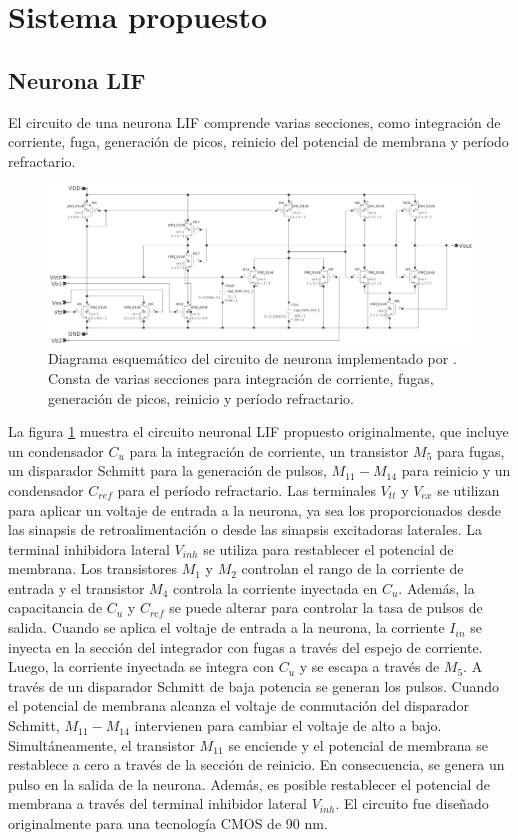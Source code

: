 \documentclass[conference]{IEEEtran}
\begin{document}
\section{Sistema propuesto}

\subsection{Neurona LIF}
El circuito de una neurona LIF comprende varias secciones, como integración de corriente, fuga, generación de picos, reinicio del potencial de membrana y período refractario.

\begin{figure}[ht]
	\centering
	\includegraphics[scale=0.14]{img/cto_neurona_LIF.png}
	\caption{Diagrama esquemático del circuito de neurona implementado por \cite{Shamsi_2018}. Consta de varias secciones para integración de corriente, fugas, generación de picos, reinicio y período refractario.
	\label{fig:cto_neurona_LIF}}
\end{figure}

La figura \ref{fig:cto_neurona_LIF} muestra el circuito neuronal LIF propuesto originalmente, que incluye un condensador $C_{u}$ para la integración de corriente, un transistor $M_5$ para fugas, un disparador Schmitt para la generación de pulsos, $M_{11}-M_{14}$ para reinicio y un condensador $C_{ref}$ para el período refractario. Las terminales $V_{tt}$ y $V_{ex}$ se utilizan para aplicar un voltaje de entrada a la neurona, ya sea los proporcionados desde las sinapsis de retroalimentación o desde las sinapsis excitadoras laterales. La terminal inhibidora lateral $V_{inh}$ se utiliza para restablecer el potencial de membrana. Los transistores $M_{1}$ y $M_{2}$ controlan el rango de la corriente de entrada y el transistor $M_{4}$ controla la corriente inyectada en $C_{u}$. Además, la capacitancia de $C_{u}$ y $C_{ref}$ se puede alterar para controlar la tasa de pulsos de salida. Cuando se aplica el voltaje de entrada a la neurona, la corriente $I_{in}$ se inyecta en la sección del integrador con fugas a través del espejo de corriente. Luego, la corriente inyectada se integra con $C_{u}$ y se escapa a través de $M_{5}$. A través de un disparador Schmitt de baja potencia se generan los pulsos. Cuando el potencial de membrana alcanza el voltaje de conmutación del disparador Schmitt, $M_{11}-M_{14}$ intervienen para cambiar el voltaje de alto a bajo. Simultáneamente, el transistor $M_{11}$ se enciende y el potencial de membrana se restablece a cero a través de la sección de reinicio. En consecuencia, se genera un pulso en la salida de la neurona. Además, es posible restablecer el potencial de membrana a través del terminal inhibidor lateral $V_{inh}$. El circuito fue diseñado originalmente para una tecnología CMOS de 90 nm.
\end{document}
